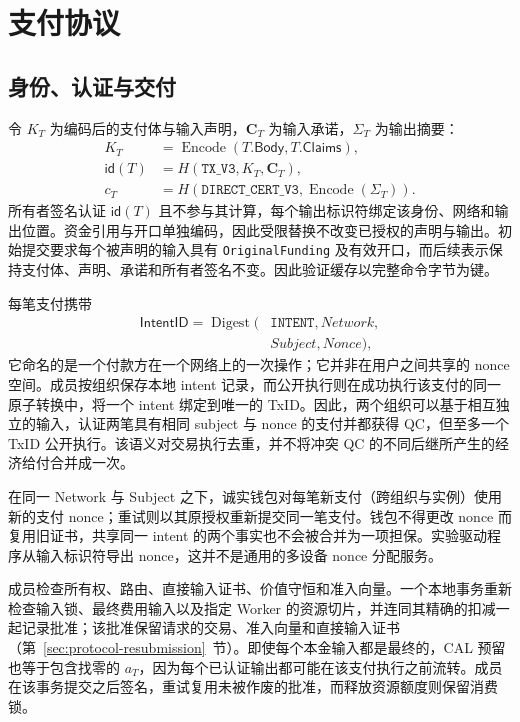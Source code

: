 \section{支付协议}
\label{sec:protocol}

\subsection{身份、认证与交付}
\label{sec:protocol-certification}

令 $K_T$ 为编码后的支付体与输入声明，$\mathbf{C}_T$ 为输入承诺，$\Sigma_T$ 为输出摘要：
\begin{equation}
  \begin{aligned}
    K_T &= \operatorname{Encode}(T.\mathsf{Body},T.\mathsf{Claims}),\\
    \mathsf{id}(T) &= H(\texttt{TX\_V3},K_T,\mathbf{C}_T),\\
    c_T &= H(\texttt{DIRECT\_CERT\_V3},\operatorname{Encode}(\Sigma_T)).
  \end{aligned}
  \label{eq:protocol-identities}
\end{equation}
所有者签名认证 $\mathsf{id}(T)$ 且不参与其计算，每个输出标识符绑定该身份、网络和输出位置。资金引用与开口单独编码，因此受限替换不改变已授权的声明与输出。初始提交要求每个被声明的输入具有 \texttt{OriginalFunding} 及有效开口，而后续表示保持支付体、声明、承诺和所有者签名不变。因此验证缓存以完整命令字节为键。

每笔支付携带
\[\begin{aligned}
\mathsf{IntentID}=\operatorname{Digest}(&\texttt{INTENT},\mathit{Network},\\
&\mathit{Subject},\mathit{Nonce}),
\end{aligned}\]
它命名的是一个付款方在一个网络上的一次操作；它并非在用户之间共享的 nonce 空间。成员按组织保存本地 intent 记录，而公开执行则在成功执行该支付的同一原子转换中，将一个 intent 绑定到唯一的 TxID。因此，两个组织可以基于相互独立的输入，认证两笔具有相同 subject 与 nonce 的支付并都获得 QC，但至多一个 TxID 公开执行。该语义对交易执行去重，并不将冲突 QC 的不同后继所产生的经济给付合并成一次。

在同一 Network 与 Subject 之下，诚实钱包对每笔新支付（跨组织与实例）使用新的支付 nonce；重试则以其原授权重新提交同一笔支付。钱包不得更改 nonce 而复用旧证书，共享同一 intent 的两个事实也不会被合并为一项担保。实验驱动程序从输入标识符导出 nonce，这并不是通用的多设备 nonce 分配服务。

成员检查所有权、路由、直接输入证书、价值守恒和准入向量。一个本地事务重新检查输入锁、最终费用输入以及指定 Worker 的资源切片，并连同其精确的扣减一起记录批准；该批准保留请求的交易、准入向量和直接输入证书（第~\ref{sec:protocol-resubmission}~节）。即使每个本金输入都是最终的，CAL 预留也等于包含找零的 $a_T$，因为每个已认证输出都可能在该支付执行之前流转。成员在该事务提交之后签名，重试复用未被作废的批准，而释放资源额度则保留消费锁。

